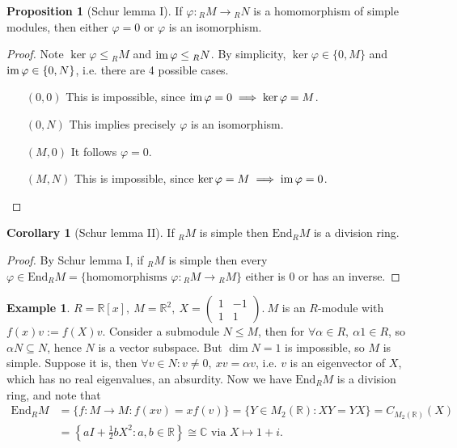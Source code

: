 \documentclass[a4paper]{article}
\newcommand{\R}{\mathbb{R}}
\newcommand{\C}{\mathbb{C}}
\newcommand{\End}{\text{End}}
\newcommand{\im}{\text{im\,}}
\theoremstyle{definition}
\newtheorem{prop}[defn]{Proposition}
\newtheorem{coro}[defn]{Corollary}
\newtheorem{example}[defn]{Example}
\begin{document}
\begin{prop}[Schur lemma I]
If $\varphi: {} _RM\rightarrow {} _RN$ is a homomorphism of simple modules, then either $\varphi=0$ or $\varphi$ is an isomorphism.
\end{prop}
\begin{proof}
Note $\ker\varphi\leq {}_RM$ and $\im\varphi\leq {}_RN$. By simplicity, $\ker\varphi\in\{0,M\}$ and $\im\varphi\in\{0,N\}$, i.e. there are 4 possible cases.
\begin{itemize}
\item[$(0,0)$] This is impossible, since $\im\varphi=0\implies\ker\varphi=M$.
\item[$(0,N)$] This implies precisely $\varphi$ is an isomorphism.
\item[$(M,0)$] It follows $\varphi=0$.
\item[$(M,N)$] This is impossible, since $\ker\varphi=M\implies\im\varphi=0$.
\end{itemize}
\end{proof}

\begin{coro}[Schur lemma II]
\label{coro:schurlem2}
If $_RM$ is simple then $\End_RM$ is a division ring.
\end{coro}
\begin{proof}
By Schur lemma I, if $_RM$ is simple then every $\varphi\in\End_RM=\{\text{homomorphisms }\varphi:{}_RM\rightarrow{}_RM\}$ either is $0$ or has an inverse.
\end{proof}

\begin{example}
$R=\R[x],\ M=\R^2,\ X=\begin{pmatrix}1&-1\\1&1\end{pmatrix}.\ M$ is an $R$-module with $f(x)v:=f(X)v$. Consider a submodule $N\leq M$, then for $\forall\alpha\in R,\ \alpha 1\in R$, so $\alpha N\subseteq N$, hence $N$ is a vector subspace. But $\dim N=1$ is impossible, so $M$ is simple. Suppose it is, then $\forall v\in N:v\neq 0,\ xv=\alpha v$, i.e. $v$ is an eigenvector of $X$, which has no real eigenvalues, an absurdity. Now we have $\End_RM$ is a division ring, and note that
\[
\begin{aligned}
\End_RM&=\{f:M\rightarrow M:f(xv)=xf(v)\}=\{Y\in M_2(\R):XY=YX\}=C_{M_2(\R)}(X)\\
&=\left\{aI+\frac12 b X^2:a,b\in\R\right\}\cong\C \text{ via } X\mapsto 1+i.
\end{aligned}
\]
\end{example}
\end{document}
